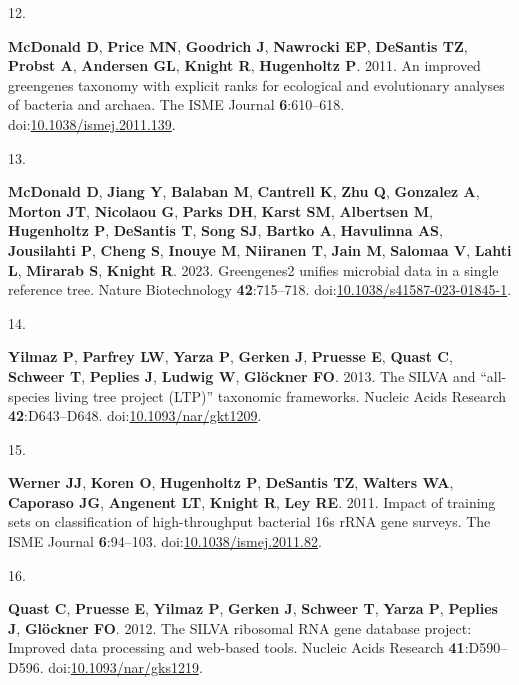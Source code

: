 \documentclass[
  11pt,
]{article}
\newlength{\cslhangindent}
\newlength{\csllabelwidth}
\newenvironment{CSLReferences}[2] %
 {\begin{list}{}{%
  \setlength{\itemindent}{0pt}
  \setlength{\leftmargin}{0pt}
  \setlength{\parsep}{0pt}
  \ifodd #1
   \setlength{\leftmargin}{\cslhangindent}
   \setlength{\itemindent}{-1\cslhangindent}
  \fi
  \setlength{\itemsep}{#2\baselineskip}}}
 {\end{list}}
\newcommand{\CSLLeftMargin}[1]{\parbox[t]{\csllabelwidth}{\strut#1\strut}}
\newcommand{\CSLRightInline}[1]{\parbox[t]{\linewidth - \csllabelwidth}{\strut#1\strut}}
\begin{document}
\begin{CSLReferences}{0}{1}
\CSLLeftMargin{12. }%
\CSLRightInline{\textbf{McDonald D}, \textbf{Price MN}, \textbf{Goodrich
J}, \textbf{Nawrocki EP}, \textbf{DeSantis TZ}, \textbf{Probst A},
\textbf{Andersen GL}, \textbf{Knight R}, \textbf{Hugenholtz P}. 2011. An
improved greengenes taxonomy with explicit ranks for ecological and
evolutionary analyses of bacteria and archaea. The ISME Journal
\textbf{6}:610--618.
doi:\href{https://doi.org/10.1038/ismej.2011.139}{10.1038/ismej.2011.139}.}

\CSLLeftMargin{13. }%
\CSLRightInline{\textbf{McDonald D}, \textbf{Jiang Y}, \textbf{Balaban
M}, \textbf{Cantrell K}, \textbf{Zhu Q}, \textbf{Gonzalez A},
\textbf{Morton JT}, \textbf{Nicolaou G}, \textbf{Parks DH},
\textbf{Karst SM}, \textbf{Albertsen M}, \textbf{Hugenholtz P},
\textbf{DeSantis T}, \textbf{Song SJ}, \textbf{Bartko A},
\textbf{Havulinna AS}, \textbf{Jousilahti P}, \textbf{Cheng S},
\textbf{Inouye M}, \textbf{Niiranen T}, \textbf{Jain M}, \textbf{Salomaa
V}, \textbf{Lahti L}, \textbf{Mirarab S}, \textbf{Knight R}. 2023.
Greengenes2 unifies microbial data in a single reference tree. Nature
Biotechnology \textbf{42}:715--718.
doi:\href{https://doi.org/10.1038/s41587-023-01845-1}{10.1038/s41587-023-01845-1}.}

\CSLLeftMargin{14. }%
\CSLRightInline{\textbf{Yilmaz P}, \textbf{Parfrey LW}, \textbf{Yarza
P}, \textbf{Gerken J}, \textbf{Pruesse E}, \textbf{Quast C},
\textbf{Schweer T}, \textbf{Peplies J}, \textbf{Ludwig W},
\textbf{Glöckner FO}. 2013. The SILVA and {``all-species living tree
project (LTP)''} taxonomic frameworks. Nucleic Acids Research
\textbf{42}:D643--D648.
doi:\href{https://doi.org/10.1093/nar/gkt1209}{10.1093/nar/gkt1209}.}

\CSLLeftMargin{15. }%
\CSLRightInline{\textbf{Werner JJ}, \textbf{Koren O}, \textbf{Hugenholtz
P}, \textbf{DeSantis TZ}, \textbf{Walters WA}, \textbf{Caporaso JG},
\textbf{Angenent LT}, \textbf{Knight R}, \textbf{Ley RE}. 2011. Impact
of training sets on classification of high-throughput bacterial 16s rRNA
gene surveys. The ISME Journal \textbf{6}:94--103.
doi:\href{https://doi.org/10.1038/ismej.2011.82}{10.1038/ismej.2011.82}.}

\CSLLeftMargin{16. }%
\CSLRightInline{\textbf{Quast C}, \textbf{Pruesse E}, \textbf{Yilmaz P},
\textbf{Gerken J}, \textbf{Schweer T}, \textbf{Yarza P}, \textbf{Peplies
J}, \textbf{Glöckner FO}. 2012. The SILVA ribosomal RNA gene database
project: Improved data processing and web-based tools. Nucleic Acids
Research \textbf{41}:D590--D596.
doi:\href{https://doi.org/10.1093/nar/gks1219}{10.1093/nar/gks1219}.}

\end{CSLReferences}
\end{document}
